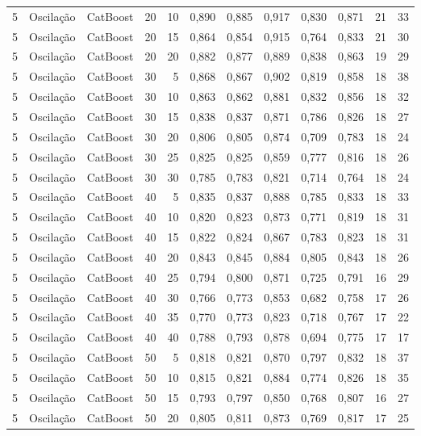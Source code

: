 \begin{longtable}{ccclrrrrrrrr}
5 & Oscilação & CatBoost & 20 & 10 & 0,890 & 0,885 & 0,917 & 0,830 & 0,871 & 21 & 33 \\
5 & Oscilação & CatBoost & 20 & 15 & 0,864 & 0,854 & 0,915 & 0,764 & 0,833 & 21 & 30 \\
5 & Oscilação & CatBoost & 20 & 20 & 0,882 & 0,877 & 0,889 & 0,838 & 0,863 & 19 & 29 \\
5 & Oscilação & CatBoost & 30 & 5 & 0,868 & 0,867 & 0,902 & 0,819 & 0,858 & 18 & 38 \\
5 & Oscilação & CatBoost & 30 & 10 & 0,863 & 0,862 & 0,881 & 0,832 & 0,856 & 18 & 32 \\
5 & Oscilação & CatBoost & 30 & 15 & 0,838 & 0,837 & 0,871 & 0,786 & 0,826 & 18 & 27 \\
5 & Oscilação & CatBoost & 30 & 20 & 0,806 & 0,805 & 0,874 & 0,709 & 0,783 & 18 & 24 \\
5 & Oscilação & CatBoost & 30 & 25 & 0,825 & 0,825 & 0,859 & 0,777 & 0,816 & 18 & 26 \\
5 & Oscilação & CatBoost & 30 & 30 & 0,785 & 0,783 & 0,821 & 0,714 & 0,764 & 18 & 24 \\
5 & Oscilação & CatBoost & 40 & 5 & 0,835 & 0,837 & 0,888 & 0,785 & 0,833 & 18 & 33 \\
5 & Oscilação & CatBoost & 40 & 10 & 0,820 & 0,823 & 0,873 & 0,771 & 0,819 & 18 & 31 \\
5 & Oscilação & CatBoost & 40 & 15 & 0,822 & 0,824 & 0,867 & 0,783 & 0,823 & 18 & 31 \\
5 & Oscilação & CatBoost & 40 & 20 & 0,843 & 0,845 & 0,884 & 0,805 & 0,843 & 18 & 26 \\
5 & Oscilação & CatBoost & 40 & 25 & 0,794 & 0,800 & 0,871 & 0,725 & 0,791 & 16 & 29 \\
5 & Oscilação & CatBoost & 40 & 30 & 0,766 & 0,773 & 0,853 & 0,682 & 0,758 & 17 & 26 \\
5 & Oscilação & CatBoost & 40 & 35 & 0,770 & 0,773 & 0,823 & 0,718 & 0,767 & 17 & 22 \\
5 & Oscilação & CatBoost & 40 & 40 & 0,788 & 0,793 & 0,878 & 0,694 & 0,775 & 17 & 17 \\
5 & Oscilação & CatBoost & 50 & 5 & 0,818 & 0,821 & 0,870 & 0,797 & 0,832 & 18 & 37 \\
5 & Oscilação & CatBoost & 50 & 10 & 0,815 & 0,821 & 0,884 & 0,774 & 0,826 & 18 & 35 \\
5 & Oscilação & CatBoost & 50 & 15 & 0,793 & 0,797 & 0,850 & 0,768 & 0,807 & 16 & 27 \\
5 & Oscilação & CatBoost & 50 & 20 & 0,805 & 0,811 & 0,873 & 0,769 & 0,817 & 17 & 25 \\

\end{longtable}
